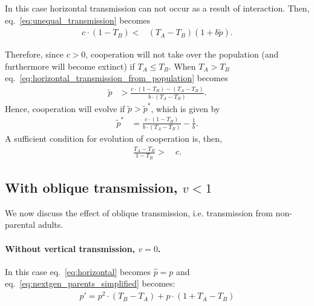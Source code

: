 \documentclass[12pt]{extarticle}
\begin{document}
In this case horizontal transmission can not occur as a result of interaction.  
Then, eq.~\ref{eq:unequal_transmission} becomes
\begin{equation} 
\begin{split} \label{eq:horizontal_transmission_from_population}
c\cdot(1-T_B) < & (T_A-T_B)(1+b\tilde{p}).
\end{split}
\end{equation}

Therefore, since $c>0$, cooperation will not take over the population (and furthermore will become extinct) if $T_A\leq T_B$.
When $T_A > T_B$ eq.~\ref{eq:horizontal_transmission_from_population} becomes
\begin{equation} 
\begin{split} \label{eq:horizontal_transmission_from_population_reorder}
\tilde{p} & > \frac{c\cdot(1-T_B) - (T_A-T_B)}{b\cdot(T_A-T_B)}.
\end{split}
\end{equation}
Hence, cooperation will evolve if $\tilde{p} > \tilde{p}^{*}$, which is given by
\begin{equation} 
\begin{split} \label{eq:horizontal_transmission_from_population_equilibrium}
\tilde{p}^{*} & = \frac{c\cdot(1-T_B)}{b\cdot(T_A-T_B)} - \frac{1}{b}.
\end{split}
\end{equation}
A sufficient condition for evolution of cooperation is, then,
\begin{equation} 
\begin{split} \label{eq:sufficient_horizontal_transmission_from_population}
\frac{T_A-T_B}{1-T_B} > &\ c.  
\end{split}
\end{equation}

\subsection*{With oblique transmission, $v<1$}
    
We now discuss the effect of oblique transmission, i.e. transmission from non-parental adults.

\paragraph*{Without vertical transmission, $v = 0$.}

In this case eq.~\ref{eq:horizontal} becomes $\hat{p}=p$ and eq.~\ref{eq:nextgen_parents_simplified} becomes:
\begin{equation} 
\begin{split}\label{eq:nextgen_parents_oblique_only}
p' = p^2\cdot(T_B-T_A) + p\cdot(1+T_A-T_B)
\end{split}
\end{equation}
\end{document}
